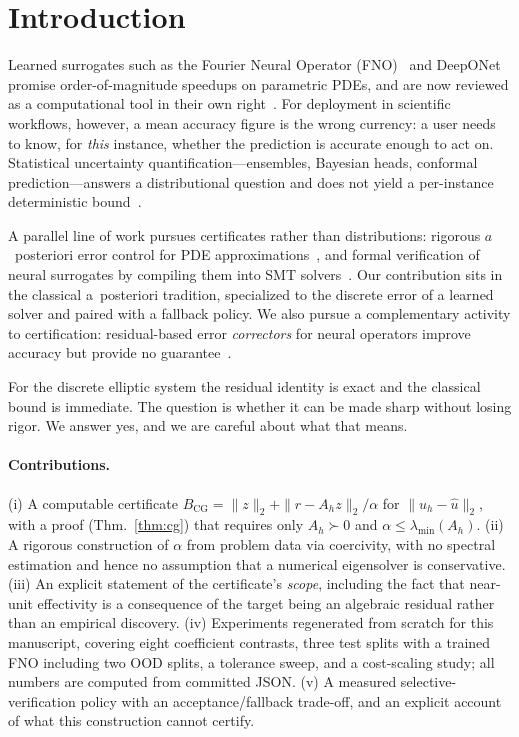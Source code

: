 \documentclass[journal]{IEEEtran}
\theoremstyle{plain}
\theoremstyle{definition}
\begin{document}
\section{Introduction}
Learned surrogates such as the Fourier Neural Operator (FNO)~\cite{li2020fourier,kovachki2023neural} and DeepONet~\cite{lu2021learning} promise order-of-magnitude speedups on parametric PDEs, and are now reviewed as a computational tool in their own right~\cite{azizzadenesheli2024neural}. For deployment in scientific workflows, however, a mean accuracy figure is the wrong currency: a user needs to know, for \emph{this} instance, whether the prediction is accurate enough to act on. Statistical uncertainty quantification---ensembles, Bayesian heads, conformal prediction---answers a distributional question and does not yield a per-instance deterministic bound~\cite{zou2025uq,song2026structure}.

A parallel line of work pursues certificates rather than distributions: rigorous $a$~posteriori error control for PDE approximations~\cite{ernst2025aposteriori,mukherjee2026rigorous}, and formal verification of neural surrogates by compiling them into SMT solvers~\cite{baheri2026formal}. Our contribution sits in the classical a~posteriori tradition, specialized to the discrete error of a learned solver and paired with a fallback policy. We also pursue a complementary activity to certification: residual-based error \emph{correctors} for neural operators improve accuracy but provide no guarantee~\cite{conforti2023residual}.

For the discrete elliptic system the residual identity is exact and the classical bound is immediate. The question is whether it can be made sharp without losing rigor. We answer yes, and we are careful about what that means.

\paragraph{Contributions.}
(i) A computable certificate $B_{\mathrm{CG}}=\|z\|_2+\|r-A_hz\|_2/\alpha$ for $\|u_h-\hat u\|_2$, with a proof (Thm.~\ref{thm:cg}) that requires only $A_h\succ0$ and $\alpha\le\lambda_{\min}(A_h)$.
(ii) A rigorous construction of $\alpha$ from problem data via coercivity, with no spectral estimation and hence no assumption that a numerical eigensolver is conservative.
(iii) An explicit statement of the certificate's \emph{scope}, including the fact that near-unit effectivity is a consequence of the target being an algebraic residual rather than an empirical discovery.
(iv) Experiments regenerated from scratch for this manuscript, covering eight coefficient contrasts, three test splits with a trained FNO including two OOD splits, a tolerance sweep, and a cost-scaling study; all numbers are computed from committed JSON.
(v) A measured selective-verification policy with an acceptance/fallback trade-off, and an explicit account of what this construction cannot certify.
\end{document}
